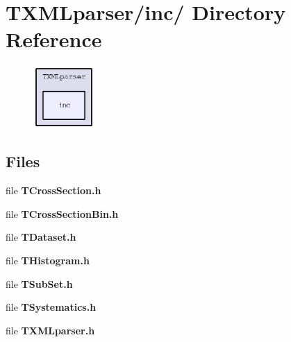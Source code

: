 \section{TXMLparser/inc/ Directory Reference}
\label{dir_28423628d14ed55ee1e2148f5d09e19c}


\begin{figure}[H]
\begin{center}
\leavevmode
\includegraphics[width=66pt]{dir_28423628d14ed55ee1e2148f5d09e19c_dep}
\end{center}
\end{figure}
\subsection*{Files}
\begin{CompactItemize}
\item 
file \textbf{TCross\-Section.h}
\item 
file \textbf{TCross\-Section\-Bin.h}
\item 
file \textbf{TDataset.h}
\item 
file \textbf{THistogram.h}
\item 
file \textbf{TSub\-Set.h}
\item 
file \textbf{TSystematics.h}
\item 
file \textbf{TXMLparser.h}
\end{CompactItemize}
